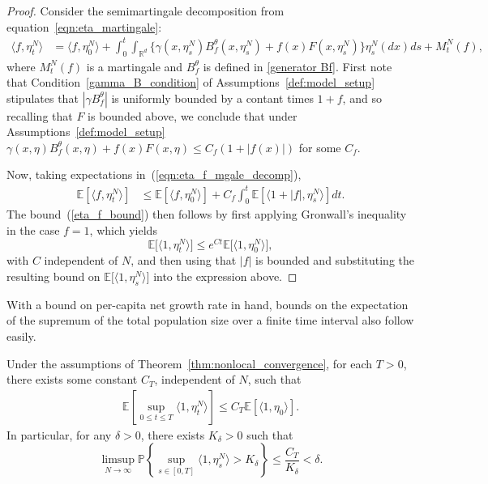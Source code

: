 \documentclass[EJP]{ejpecp} %
\newcommand{\IP}{\mathbb P}
\newcommand{\IE}{\mathbb E}
\newcommand{\IR}{\mathbb R}
\begin{document}
\begin{proof}
Consider the semimartingale decomposition from equation~\eqref{eqn:eta_martingale}:
\begin{align} \label{eqn:eta_f_mgale_decomp}
    \langle f, \eta^N_t \rangle
    &=
    \langle f, \eta^N_0 \rangle
    + \int_0^t \int_{\IR^d} \big\{
        \gamma(x, \eta^N_s) B^\theta_f(x, \eta^N_s)
        + f(x) F(x, \eta^N_s)
        \big\} \eta^N_s(dx) ds
    + M^N_t(f) ,
\end{align}
where $M^N_t(f)$ is a martingale and $B^\theta_f$ is defined in \eqref{generator Bf}.
First note that Condition~\ref{gamma_B_condition} of Assumptions~\ref{def:model_setup}
stipulates that $|\gamma B^\theta_f|$ is uniformly bounded by a contant times $1 + f$,
and so recalling that $F$ is bounded above, we conclude that
under Assumptions~\ref{def:model_setup}
$\gamma(x, \eta) B^\theta_f(x, \eta) + f(x) F(x, \eta) \le C_f (1 + |f(x)|)$ for some $C_f$.

Now, taking expectations in~(\ref{eqn:eta_f_mgale_decomp}),
    \begin{align}
\label{bound on intfdeta}
        \IE\left[ \langle f, \eta^N_t \rangle \right]
        &\le
        \IE\left[ \langle f, \eta^N_0 \rangle \right]
        + C_f \int_0^t \IE\left[ \langle 1 + |f|, \eta^N_s \rangle \right] dt .
    \end{align}
The bound~(\ref{eta_f_bound}) then follows by first applying Gronwall's
inequality in the case $f=1$, which yields
\[
	\IE\big[\langle 1,\eta_t^N\rangle\big]\leq e^{Ct}\IE\big[\langle 1,\eta_0^N\rangle\big],
\]
with $C$ independent of $N$, and then using that $|f|$ is bounded and
substituting the resulting bound on $\IE\big[\langle 1,\eta_s^N\rangle\big]$ into the
expression above.
\end{proof}

With a bound on per-capita net growth rate in hand,
bounds on the expectation of the supremum of 
the total population size over a finite time interval also follow easily.

\begin{lemma}
    \label{lem:eta_compact_containment}
    Under the assumptions of Theorem~\ref{thm:nonlocal_convergence},
    for each $T>0$, there exists some constant $C_T$,
independent of $N$,
    such that
    \begin{align}
        \label{eqn:eta_mass_bound}
        \IE\left[
            \sup_{0 \le t \le T}
            \langle 1, \eta^{N}_t \rangle
        \right]
        \le C_T \IE[\langle 1,\eta_0\rangle].
    \end{align}
    In particular, for any $\delta > 0$, there exists $K_{\delta}>0$ such that
    \begin{equation}
    \limsup_{N \to \infty}
        \IP \left\{ \sup_{s \in [0,T]}
            \langle 1 ,\eta^{N}_{s}\rangle
            > K_\delta \right\}
        \leq \frac{C_T}{K_{\delta}}
        < \delta.
    \end{equation}
\end{lemma}
\end{document}
